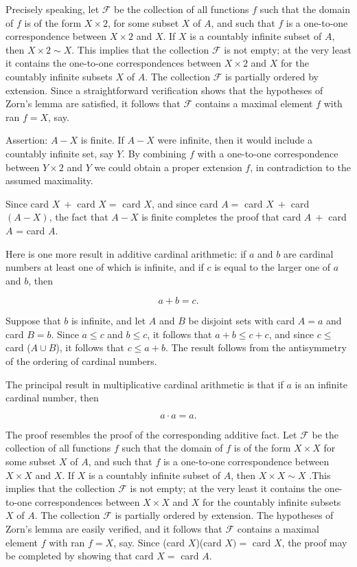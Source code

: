 Precisely speaking, let $\mathcal{F}$ be the collection of all functions $f$ such that the domain of $f$ is of the form $X \times 2$, for some subset $X$ of $A$, and such that $f$ is a one-to-one correspondence between $X \times 2$ and $X$. If $X$ is a countably infinite subset of $A$, then $X \times 2 \sim X$. This implies that the collection $\mathcal{F}$ is not empty; at the very least it contains the one-to-one correspondences between $X \times 2$ and $X$ for the countably infinite subsets $X$ of $A$. The collection $\mathcal{F}$ is partially ordered by extension. Since a straightforward verification shows that the hypotheses of Zorn's lemma are satisfied, it follows that $\mathcal{F}$ contains a maximal element $f$ with ran $f = X$, say. 

Assertion: $A - X$ is finite. If $A - X$ were infinite, then it would include a countably infinite set, say $Y$. By combining $f$ with a one-to-one correspondence between $Y \times 2$ and $Y$ we could obtain a proper extension $f$, in contradiction to the assumed maximality. 

Since card $X\ +$ card $X =$ card $X$, and since card $A = $ card $X\ +$ card $(A - X)$, the fact that $A - X$ is finite completes the proof that card $A\ +$ card $A$ = card $A$.

Here is one more result in additive cardinal arithmetic: if $a$ and $b$ are cardinal numbers at least one of which is infinite, and if $c$ is equal to the larger one of $a$ and $b$, then 

\begin{equation*}
a + b = c.
\end{equation*}

Suppose that $b$ is infinite, and let $A$ and $B$ be disjoint sets with card $A = a$ and card $B = b$. Since $a \le c$ and $b \le c$, it follows that $a + b \le c + c$, and since $c \le$ card ($A \cup B$), it follows that $c \le a + b$. The result follows from the antisymmetry of the ordering of cardinal numbers. 

The principal result in multiplicative cardinal arithmetic is that if $a$ is an infinite cardinal number, then 

\begin{equation*}
a \cdot a = a. 
\end{equation*}

The proof resembles the proof of the corresponding additive fact. Let $\mathcal{F}$ be the collection of all functions $f$ such that the domain of $f$ is of the form $X \times X$ for some subset $X$ of $A$, and such that $f$ is a one-to-one correspondence between $X \times X$ and $X$. If $X$ is a countably infinite subset of $A$, then $X \times X \sim X$ .This implies that the collection $\mathcal{F}$ is not empty; at the very least it contains the one-to-one correspondences between $X \times X$ and $X$ for the countably infinite subsets $X$ of $A$. The collection $\mathcal{F}$ is partially ordered by extension. The hypotheses of Zorn's lemma are easily verified, and it follows that $\mathcal{F}$ contains a maximal element $f$ with ran $f = X$, say. Since (card $X$)(card $X) =$ card $X$, the proof may be completed by showing that card $X =$ card $A$. 

